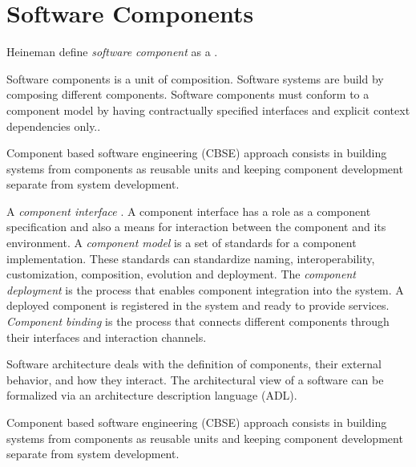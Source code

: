 \section{Software Components}
Heineman define \emph{software component} as a
\cite{heineman_component-based_2001}.

Software components is a unit of composition. Software systems are build by composing different components.  Software components must conform to a component model by having contractually specified interfaces and explicit context dependencies only.\cite{szyperski_component_2002}.

Component based software engineering (CBSE) approach consists in building systems from components as reusable units and keeping component development separate from system development\cite{crnkovic_software_2011}.

A \emph{component	interface} \cite{crnkovic_software_2011}.
A component interface has a role as a component specification and also a means for interaction between the component and its environment.
A \emph{component model} is a set of standards for a component implementation. These standards can standardize naming, interoperability, customization, composition, evolution and deployment.\cite{heineman_component-based_2001}
The \emph{component deployment} is the process that enables component integration into the system. A deployed component is registered in the system and ready to provide services\cite{crnkovic_software_2011}.
\emph{Component binding} is the process that connects different components through their interfaces and interaction channels.

Software architecture deals with the definition of components, their external behavior, and how they interact\cite{kaur_component_2010}. The architectural view of a software can be formalized via an architecture description language (ADL)\cite{medvidovic_classification_2000}.


Component based software engineering (CBSE) approach consists in building systems from components as reusable units and keeping component development separate from system development\cite{crnkovic_software_2011}.

